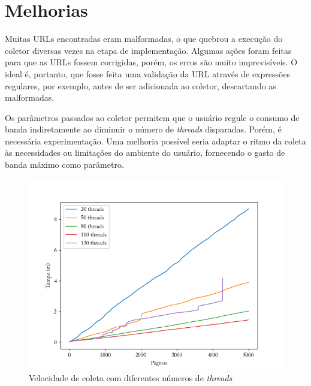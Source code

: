 \documentclass[paper=a4, fontsize=11pt]{scrartcl}
\numberwithin{equation}{section}		%
\numberwithin{figure}{section}			%
\numberwithin{table}{section}				%
\begin{document}
\section{Melhorias}
Muitas URLs encontradas eram malformadas, o que quebrou a execução do coletor diversas vezes na etapa de implementação. Algumas ações foram feitas para que as URLs fossem corrigidas, porém, os erros são muito imprevisíveis. O ideal é, portanto, que fosse feita uma validação da URL através de expressões regulares, por exemplo, antes de ser adicionada ao coletor, descartando as malformadas.

Os parâmetros passados ao coletor permitem que o usuário regule o consumo de banda indiretamente ao diminuir o número de \textit{threads} disparadas. Porém, é necessária experimentação. Uma melhoria possível seria adaptar o ritmo da coleta às necessidades ou limitações do ambiente do usuário, fornecendo o gasto de banda máximo como parâmetro.

\begin{figure}
  \caption{Velocidade de coleta com diferentes números de \textit{threads}}
  \label{fig:threads}
  \centering
    \includegraphics[width=1\textwidth]{threads}
\end{figure}
\end{document}
